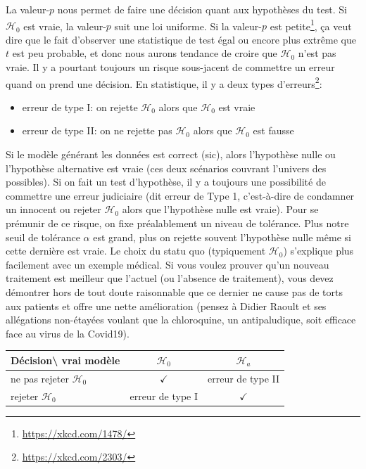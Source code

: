 \documentclass[
  11pt,
  letterpaper,
]{book}
\providecommand{\tightlist}{%
  \setlength{\itemsep}{0pt}\setlength{\parskip}{0pt}}
\renewcommand{\href}[2]{#2\footnote{\url{#1}}}
\begin{document}
La valeur-\(p\) nous permet de faire une décision quant aux hypothèses du test. Si \(\mathscr{H}_0\) est vraie, la valeur-\(p\) suit une loi uniforme. \href{https://xkcd.com/1478/}{Si la valeur-\(p\) est petite}, ça veut dire que le fait d'observer une statistique de test égal ou encore plus extrême que \(t\) est peu probable, et donc nous aurons tendance de croire que \(\mathscr{H}_0\) n'est pas vraie. Il y a pourtant toujours un risque sous-jacent de commettre un erreur quand on prend une décision. En statistique, il y a \href{https://xkcd.com/2303/}{deux types d'erreurs}:

\begin{itemize}
\tightlist
\item
  erreur de type I: on rejette \(\mathscr{H}_0\) alors que \(\mathscr{H}_0\) est vraie
\item
  erreur de type II: on ne rejette pas \(\mathscr{H}_0\) alors que \(\mathscr{H}_0\) est fausse
\end{itemize}

Si le modèle générant les données est correct (sic), alors l'hypothèse nulle ou l'hypothèse alternative est vraie (ces deux scénarios couvrant l'univers des possibles). Si on fait un test d'hypothèse, il y a toujours une possibilité de commettre une erreur judiciaire (dit erreur de Type 1, c'est-à-dire de condamner un innocent ou rejeter \(\mathscr{H}_0\) alors que l'hypothèse nulle est vraie). Pour se prémunir de ce risque, on fixe préalablement un niveau de tolérance. Plus notre seuil de tolérance \(\alpha\) est grand, plus on rejette souvent l'hypothèse nulle même si cette dernière est vraie. Le choix du statu quo (typiquement \(\mathscr{H}_0\)) s'explique plus facilement avec un exemple médical. Si vous voulez prouver qu'un nouveau traitement est meilleur que l'actuel (ou l'absence de traitement), vous devez démontrer hors de tout doute raisonnable que ce dernier ne cause pas de torts aux patients et offre une nette amélioration (pensez à Didier Raoult et ses allégations non-étayées voulant que la chloroquine, un antipaludique, soit efficace face au virus de la Covid19).

\begin{longtable}[]{@{}lcc@{}}
\toprule
Décision\textbackslash{} vrai modèle & \(\mathscr{H}_0\) & \(\mathscr{H}_a\)\tabularnewline
\midrule
\endhead
ne pas rejeter \(\mathscr{H}_0\) & \(\checkmark\) & erreur de type II\tabularnewline
rejeter \(\mathscr{H}_0\) & erreur de type I & \(\checkmark\)\tabularnewline
\bottomrule
\end{longtable}
\end{document}
